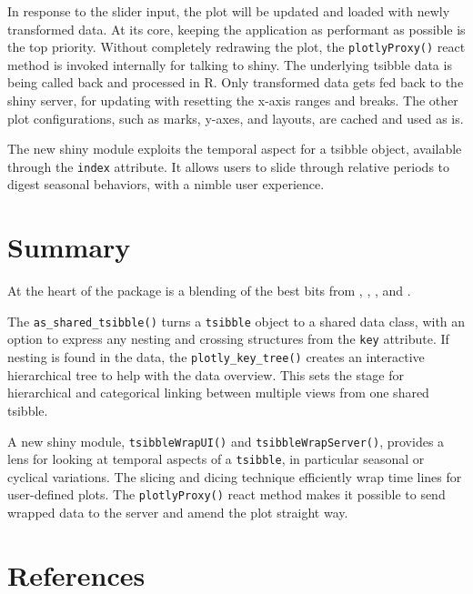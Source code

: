 In response to the slider input, the plot will be updated and loaded
with newly transformed data. At its core, keeping the application as
performant as possible is the top priority. Without completely redrawing
the plot, the \texttt{plotlyProxy()} react method is invoked internally
for talking to shiny. The underlying tsibble data is being called back
and processed in R. Only transformed data gets fed back to the shiny
server, for updating with resetting the x-axis ranges and breaks. The
other plot configurations, such as marks, y-axes, and layouts, are
cached and used as is.

The new shiny module exploits the temporal aspect for a tsibble object,
available through the \texttt{index} attribute. It allows users to slide
through relative periods to digest seasonal behaviors, with a nimble
user experience.

\hypertarget{summary}{%
\section{Summary}\label{summary}}

At the heart of the  package is a blending of the
best bits from , , ,
and .

The \texttt{as\_shared\_tsibble()} turns a \texttt{tsibble} object to a
shared data class, with an option to express any nesting and crossing
structures from the \texttt{key} attribute. If nesting is found in the
data, the \texttt{plotly\_key\_tree()} creates an interactive
hierarchical tree to help with the data overview. This sets the stage
for hierarchical and categorical linking between multiple views from one
shared tsibble.

A new shiny module, \texttt{tsibbleWrapUI()} and
\texttt{tsibbleWrapServer()}, provides a lens for looking at temporal
aspects of a \texttt{tsibble}, in particular seasonal or cyclical
variations. The slicing and dicing technique efficiently wrap time lines
for user-defined plots. The \texttt{plotlyProxy()} react method makes it
possible to send wrapped data to the server and amend the plot straight
way.

\hypertarget{references}{%
\section{References}\label{references}}

\begin{verbatim}
\end{verbatim}

